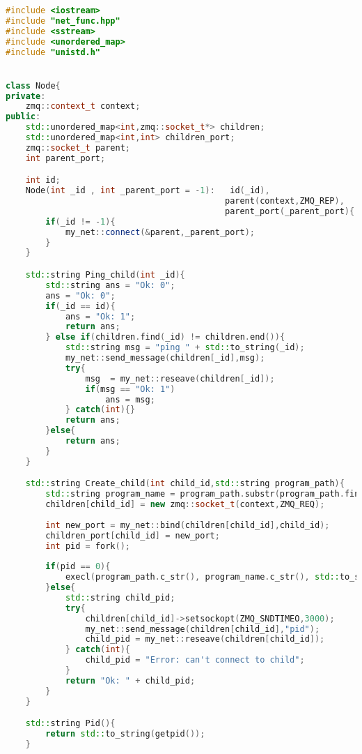 \documentclass[pdf, unicode, 12pt, a4paper,oneside,fleqn]{article}
\begin{document}
\begin{lstlisting}[language=C++]
#include <iostream>
#include "net_func.hpp"
#include <sstream>
#include <unordered_map>
#include "unistd.h"


class Node{
private:
    zmq::context_t context;
public:
    std::unordered_map<int,zmq::socket_t*> children;
    std::unordered_map<int,int> children_port;
    zmq::socket_t parent;
    int parent_port;

    int id;
    Node(int _id , int _parent_port = -1):   id(_id),
                                            parent(context,ZMQ_REP),
                                            parent_port(_parent_port){
        if(_id != -1){
            my_net::connect(&parent,_parent_port);
        }
    }

    std::string Ping_child(int _id){
        std::string ans = "Ok: 0";
        ans = "Ok: 0";
        if(_id == id){
            ans = "Ok: 1";
            return ans;
        } else if(children.find(_id) != children.end()){
            std::string msg = "ping " + std::to_string(_id);
            my_net::send_message(children[_id],msg);
            try{
                msg  = my_net::reseave(children[_id]);
                if(msg == "Ok: 1")
                    ans = msg;
            } catch(int){}
            return ans;
        }else{
            return ans;
        }
    } 

    std::string Create_child(int child_id,std::string program_path){
        std::string program_name = program_path.substr(program_path.find_last_of("/") + 1);
        children[child_id] = new zmq::socket_t(context,ZMQ_REQ);
        
        int new_port = my_net::bind(children[child_id],child_id);
        children_port[child_id] = new_port;
        int pid = fork();
        
        if(pid == 0){
            execl(program_path.c_str(), program_name.c_str(), std::to_string(child_id).c_str() , std::to_string(new_port).c_str() ,(char*)NULL);
        }else{
            std::string child_pid;
            try{
                children[child_id]->setsockopt(ZMQ_SNDTIMEO,3000);
                my_net::send_message(children[child_id],"pid");
                child_pid = my_net::reseave(children[child_id]);
            } catch(int){
                child_pid = "Error: can't connect to child";
            }
            return "Ok: " + child_pid;
        }
    }

    std::string Pid(){
        return std::to_string(getpid());
    }


\end{lstlisting}
\end{document}
